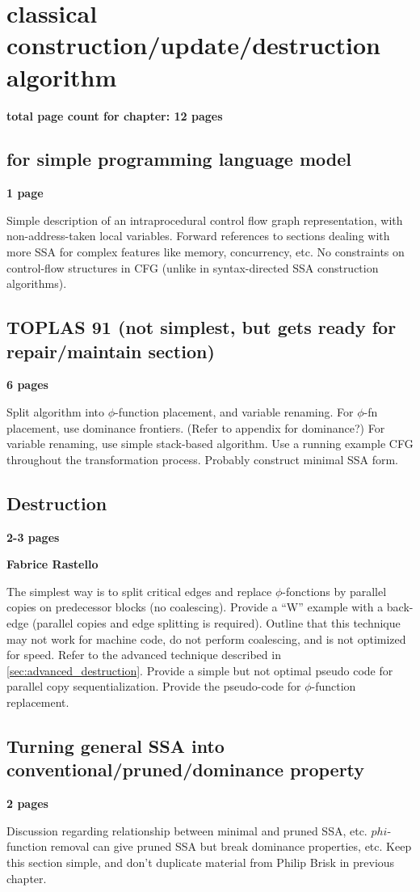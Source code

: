 \applynumberofpages\chapter{classical construction/update/destruction algorithm }


\textbf{total page count for chapter: 12 pages}

\section{for simple programming language model}
\textbf{1 page}

Simple description of an intraprocedural control flow graph
representation, with non-address-taken local variables.
Forward references to sections dealing with more SSA for complex
features like memory, concurrency, etc.
No constraints on control-flow structures in CFG
(unlike in syntax-directed SSA construction algorithms).


\section{TOPLAS 91 (not simplest, but gets ready for repair/maintain section)}
\textbf{6 pages}

Split algorithm into $\phi$-function placement, and variable
renaming. For $\phi$-fn placement, use dominance frontiers.
(Refer to appendix for dominance?) 
For variable renaming, use simple stack-based algorithm.
Use a running example CFG throughout the transformation process.
Probably construct minimal SSA form.

\section{Destruction }
\textbf{2-3 pages}

\textbf{Fabrice Rastello}

The simplest way is to split critical edges and replace $\phi$-fonctions by parallel copies on predecessor blocks (no coalescing). Provide a ``W'' example with a back-edge (parallel copies and edge splitting is required). Outline that this technique may not work for machine code, do not perform coalescing, and is not optimized for speed. Refer to the advanced technique described in \ref{sec:advanced_destruction}. Provide a simple but not optimal pseudo code for parallel copy sequentialization. Provide the pseudo-code for $\phi$-function replacement.

\section{Turning general SSA into conventional/pruned/dominance property}
\textbf{2 pages}

Discussion regarding relationship between minimal and pruned SSA, etc.
$phi$-function removal can give pruned SSA but break
dominance properties, etc. Keep this section simple, and don't duplicate
material from Philip Brisk in previous chapter.


